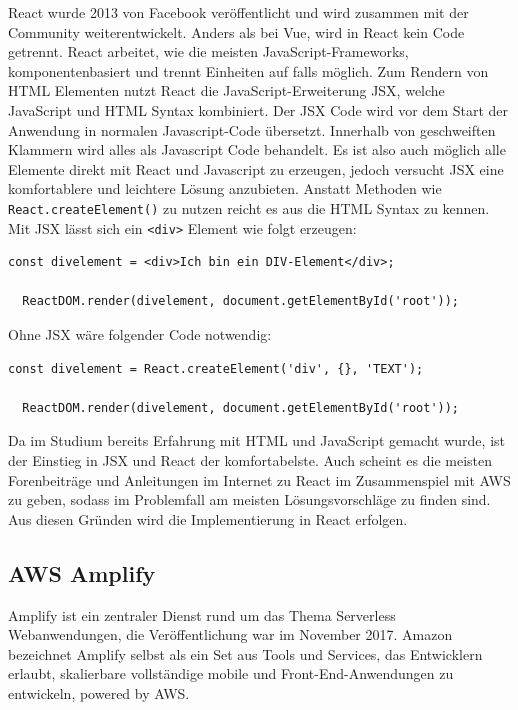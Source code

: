 {React wurde 2013 von Facebook veröffentlicht und wird zusammen mit der Community weiterentwickelt.
Anders als bei Vue, wird in React kein Code getrennt.
React arbeitet, wie die meisten JavaScript-Frameworks, komponentenbasiert und trennt Einheiten auf falls möglich.
Zum Rendern von HTML Elementen nutzt React die JavaScript-Erweiterung JSX, welche JavaScript und HTML Syntax kombiniert.
Der JSX Code wird vor dem Start der Anwendung in normalen Javascript-Code übersetzt.
Innerhalb von geschweiften Klammern wird alles als Javascript Code behandelt.
Es ist also auch möglich alle Elemente direkt mit React und Javascript zu erzeugen, jedoch versucht JSX eine komfortablere und leichtere Lösung anzubieten.
Anstatt Methoden wie \verb+React.createElement()+ zu nutzen reicht es aus die HTML Syntax zu kennen.
Mit JSX lässt sich ein \verb+<div>+ Element wie folgt erzeugen:
\begin{lstlisting}[basicstyle=\ttfamily, breaklines=true , frame = single, backgroundcolor=\color{lightgray} ]
  const divelement = <div>Ich bin ein DIV-Element</div>;

  ReactDOM.render(divelement, document.getElementById('root'));
\end{lstlisting}

Ohne JSX wäre folgender Code notwendig:
\begin{lstlisting}[basicstyle=\ttfamily, breaklines=true , frame = single, backgroundcolor=\color{lightgray} ]
  const divelement = React.createElement('div', {}, 'TEXT');

  ReactDOM.render(divelement, document.getElementById('root'));
\end{lstlisting}
\cite[]{JSX}

Da im Studium bereits Erfahrung mit HTML und JavaScript gemacht wurde, ist der Einstieg in JSX und React der komfortabelste.
Auch scheint es die meisten Forenbeiträge und Anleitungen im Internet zu React im Zusammenspiel mit AWS zu geben, sodass im Problemfall am meisten Lösungsvorschläge zu finden sind.
Aus diesen Gründen wird die Implementierung in React erfolgen.


\subsection{AWS Amplify}
\label{Amplify}

Amplify ist ein zentraler Dienst rund um das Thema Serverless Webanwendungen, die Veröffentlichung war im November 2017.
Amazon bezeichnet Amplify selbst als {}\glqq ein Set aus Tools und Services, das Entwicklern erlaubt, skalierbare vollständige
mobile und Front-End-Anwendungen zu entwickeln, powered by AWS.\grqq{}\cite[]{AWSAmplify}

}
